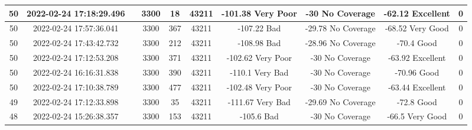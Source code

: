 \begin{longtable*}{|c|c|c|c|c|c|c|c|c|c|}
50&2022-02-24 17:18:29.496&&3300&18&43211& -101.38   Very Poor   & -30       No Coverage & -62.12    Excellent   & 0\\\hline
{}50&2022-02-24 17:57:36.041&&3300&367&43211& -107.22   Bad         & -29.78    No Coverage & -68.52    Very Good   & 0\\\hline
{}50&2022-02-24 17:43:42.732&&3300&212&43211& -108.98   Bad         & -28.96    No Coverage & -70.4     Good        & 0\\\hline
{}50&2022-02-24 17:12:53.208&&3300&371&43211& -102.62   Very Poor   & -30       No Coverage & -63.92    Excellent   & 0\\\hline
{}50&2022-02-24 16:16:31.838&&3300&390&43211& -110.1    Very Bad    & -30       No Coverage & -70.96    Good        & 0\\\hline
{}50&2022-02-24 17:10:38.789&&3300&477&43211& -102.48   Very Poor   & -30       No Coverage & -63.44    Excellent   & 0\\\hline
{}49&2022-02-24 17:12:33.898&&3300&35&43211& -111.67   Very Bad    & -29.69    No Coverage & -72.8     Good        & 0\\\hline
{}48&2022-02-24 15:26:38.357&&3300&153&43211& -105.6    Bad         & -30       No Coverage & -66.5     Very Good   & 0\\\hline

\end{longtable*}
